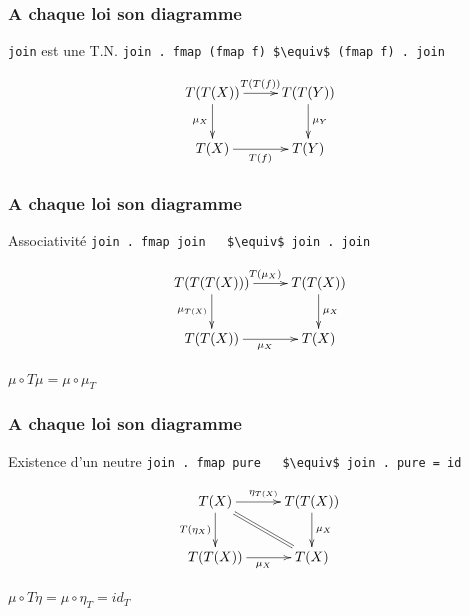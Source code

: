 \documentclass{beamer}
\begin{document}
\begin{frame}
\frametitle{A chaque loi son diagramme}
\begin{alertblock}{\verb!join! est une T.N.}
\verb!join . fmap (fmap f) $\equiv$ (fmap f) . join!
\end{alertblock}

\begin{block}{}
\[
\xymatrix{
T(T(X)) \ar[r]^{T(T(f))} \ar[d]_{\mu_{X}} & T(T(Y)) \ar[d]^{\mu_{Y}} \\
T(X) \ar[r]_{T(f)} & T(Y) \\
}
\]
\end{block}

\end{frame}


\begin{frame}
\frametitle{A chaque loi son diagramme}
\begin{alertblock}{Associativité}
\verb!join . fmap join   $\equiv$ join . join!
\end{alertblock}

\begin{block}{}

\[
\xymatrix{
T(T(T(X))) \ar[r]^{T(\mu_X)} \ar[d]_{\mu_{T(X)}} & T(T(X)) \ar[d]^{\mu_X} \\
T(T(X)) \ar[r]_{\mu_X} & T(X) \\
}
\]
\end{block}

\begin{block}{}
\begin{center}
$\mu \circ T\mu = \mu \circ \mu_T$
\end{center}
\end{block}

\end{frame}

\begin{frame}
\frametitle{A chaque loi son diagramme}
\begin{alertblock}{Existence d'un neutre}
\verb!join . fmap pure   $\equiv$ join . pure = id!
\end{alertblock}

\begin{block}{}
\[
\xymatrix{
T(X) \ar[r]^{\eta_{T(X)}} \ar[d]_{T(\eta_X)}  \ar@{=}[dr] & T(T(X)) \ar[d]^{\mu_X} \\
T(T(X)) \ar[r]_{\mu_X} & T(X) \\
}
\]
\end{block}

\begin{block}{}
\begin{center}
$\mu \circ T \eta = \mu \circ \eta_T = id_T$
\end{center}
\end{block}

\end{frame}
\end{document}
